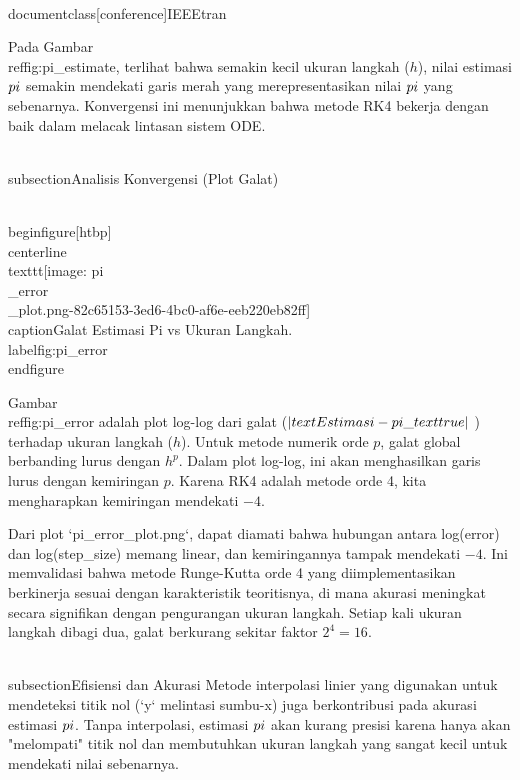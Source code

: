 \\documentclass[conference]{IEEEtran}
\begin{document}
Pada Gambar \\ref{fig:pi\_estimate}, terlihat bahwa semakin kecil ukuran langkah ($h$), nilai estimasi $\\pi$ semakin mendekati garis merah yang merepresentasikan nilai $\\pi$ yang sebenarnya. Konvergensi ini menunjukkan bahwa metode RK4 bekerja dengan baik dalam melacak lintasan sistem ODE.

\\subsection{Analisis Konvergensi (Plot Galat)}

\\begin{figure}[htbp]
\\centerline{\\texttt{[image: pi\\\_error\\\_plot.png-82c65153-3ed6-4bc0-af6e-eeb220eb82ff]}}
\\caption{Galat Estimasi Pi vs Ukuran Langkah.}
\\label{fig:pi\_error}
\\end{figure}

Gambar \\ref{fig:pi\_error} adalah plot log-log dari galat ($|\\text{Estimasi} - \\pi\_{\\text{true}}|$ ) terhadap ukuran langkah ($h$). Untuk metode numerik orde $p$, galat global berbanding lurus dengan $h^p$. Dalam plot log-log, ini akan menghasilkan garis lurus dengan kemiringan $p$. Karena RK4 adalah metode orde 4, kita mengharapkan kemiringan mendekati $-4$.

Dari plot `pi_error_plot.png`, dapat diamati bahwa hubungan antara log(error) dan log(step\_size) memang linear, dan kemiringannya tampak mendekati $-4$. Ini memvalidasi bahwa metode Runge-Kutta orde 4 yang diimplementasikan berkinerja sesuai dengan karakteristik teoritisnya, di mana akurasi meningkat secara signifikan dengan pengurangan ukuran langkah. Setiap kali ukuran langkah dibagi dua, galat berkurang sekitar faktor $2^4 = 16$.

\\subsection{Efisiensi dan Akurasi}
Metode interpolasi linier yang digunakan untuk mendeteksi titik nol (`y` melintasi sumbu-x) juga berkontribusi pada akurasi estimasi $\\pi$. Tanpa interpolasi, estimasi $\\pi$ akan kurang presisi karena hanya akan "melompati" titik nol dan membutuhkan ukuran langkah yang sangat kecil untuk mendekati nilai sebenarnya.
\end{document}
